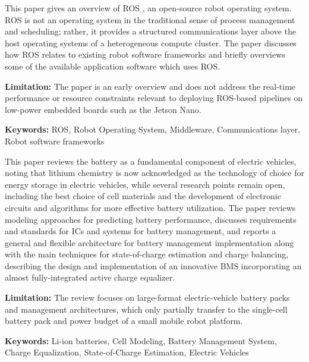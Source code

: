 {
	This paper gives an overview of ROS \cite{Quigley:2009}, an open-source robot operating system. ROS is not an operating system in the traditional sense of process management and scheduling; rather, it provides a structured communications layer above the host operating systems of a heterogeneous compute cluster. The paper discusses how ROS relates to existing robot software frameworks and briefly overviews some of the available application software which uses ROS.
	
	\bigskip
	\textbf{Limitation:} The paper is an early overview and does not address the real-time performance or resource constraints relevant to deploying ROS-based pipelines on low-power embedded boards such as the Jetson Nano.
	
	\scriptsize{\textbf{Keywords:} ROS, Robot Operating System, Middleware, Communications layer, Robot software frameworks}
}

{
	This paper \cite{Tewari:2011} reviews the battery as a fundamental component of electric vehicles, noting that lithium chemistry is now acknowledged as the technology of choice for energy storage in electric vehicles, while several research points remain open, including the best choice of cell materials and the development of electronic circuits and algorithms for more effective battery utilization. The paper reviews modeling approaches for predicting battery performance, discusses requirements and standards for ICs and systems for battery management, and reports a general and flexible architecture for battery management implementation along with the main techniques for state-of-charge estimation and charge balancing, describing the design and implementation of an innovative BMS incorporating an almost fully-integrated active charge equalizer.
	
	\bigskip
	\textbf{Limitation:} The review focuses on large-format electric-vehicle battery packs and management architectures, which only partially transfer to the single-cell battery pack and power budget of a small mobile robot platform.
	
	\scriptsize{\textbf{Keywords:} Li-ion batteries, Cell Modeling, Battery Management System, Charge Equalization, State-of-Charge Estimation, Electric Vehicles}
}



